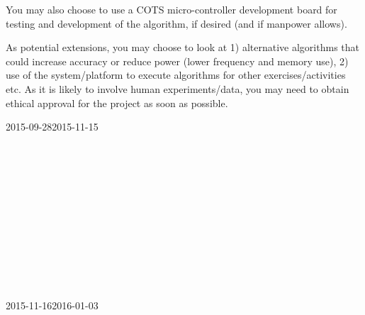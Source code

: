 \documentclass{article}
\begin{document}
You may also choose to use a COTS micro-controller development board for testing and development of the algorithm, if desired (and if manpower allows).

As potential extensions, you may choose to look at 1) alternative algorithms that could increase accuracy or reduce power (lower frequency and memory use), 2) use of the system/platform to execute algorithms for other exercises/activities etc. As it is likely to involve human experiments/data, you may need to obtain ethical approval for the project as soon as possible.

\newpage
\begin{landscape}

\begin{ganttchart}[
		hgrid,
		vgrid,
		x unit=4mm,
		time slot format=isodate
	]{2015-09-28}{2015-11-15}
	 \\

	 \\
	 \\
	 \ganttnewline[thick]

	 \\
	 \\
	 \ganttnewline[thick]

	 \\
	 \\
	 \\
	 \ganttnewline[thick]

	 \\
	 \\
\end{ganttchart}

\begin{ganttchart}[
		hgrid,
		vgrid,
		x unit=4mm,
		time slot format=isodate
	]{2015-11-16}{2016-01-03}
	 \\


\end{ganttchart}
\end{landscape}
\end{document}
